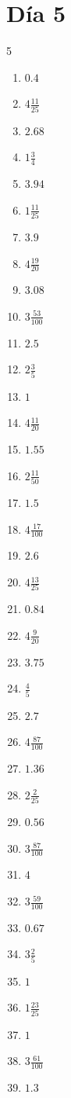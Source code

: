 \documentclass[12pt]{article}
\begin{document}
\section*{Día 5}
\begin{multicols}{5}\begin{enumerate}
\item $ 0.4 $
\item $ 4 \frac{11}{25} $
\item $ 2.68 $
\item $ 1 \frac{3}{4} $
\item $ 3.94 $
\item $ 1 \frac{11}{25} $
\item $ 3.9 $
\item $ 4 \frac{19}{20} $
\item $ 3.08 $
\item $ 3 \frac{53}{100} $
\item $ 2.5 $
\item $ 2 \frac{3}{5} $
\item $ 1 $
\item $ 4 \frac{11}{20} $
\item $ 1.55 $
\item $ 2 \frac{11}{50} $
\item $ 1.5 $
\item $ 4 \frac{17}{100} $
\item $ 2.6 $
\item $ 4 \frac{13}{25} $
\item $ 0.84 $
\item $ 4 \frac{9}{20} $
\item $ 3.75 $
\item $ \frac{4}{5} $
\item $ 2.7 $
\item $ 4 \frac{87}{100} $
\item $ 1.36 $
\item $ 2 \frac{2}{25} $
\item $ 0.56 $
\item $ 3 \frac{87}{100} $
\item $ 4 $
\item $ 3 \frac{59}{100} $
\item $ 0.67 $
\item $ 3 \frac{2}{5} $
\item $ 1 $
\item $ 1 \frac{23}{25} $
\item $ 1 $
\item $ 3 \frac{61}{100} $
\item $ 1.3 $

\end{enumerate}
\end{multicols}
\end{document}
